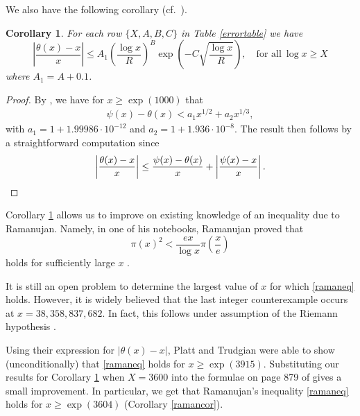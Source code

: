 \documentclass[reqno]{amsart}
\newtheorem{corollary}[theorem]{Corollary}
\numberwithin{equation}{section}
\theoremstyle{remark}
\begin{document}
We also have the following corollary (cf.\ \cite[Corollary 1]{P_T_2021}).
\begin{corollary}\label{errorcor}
    For each row $\{X,A,B,C\}$ in Table \ref{errortable} we have
    \begin{equation*}
        \left|\frac{\theta(x)-x}{x}\right|\leq A_1\left(\frac{\log x}{R}\right)^B\exp\left(-C\sqrt{\frac{\log x}{R}}\right),\quad\text{for all}\ \log x\geq X 
    \end{equation*}
    where $A_1=A+0.1$.
\end{corollary}
\begin{proof}
     By \cite[Corollary 5.1]{BKLNW_21}, we have for $x\geq\exp(1000)$ that
    \begin{align*}
        \psi(x)-\theta(x)<a_1x^{1/2}+a_2x^{1/3},
    \end{align*}
    with $a_1=1+1.99986\cdot 10^{-12}$ and $a_2=1+1.936\cdot 10^{-8}$. The result then follows by a straightforward computation since
    \begin{equation*}
        \left|\frac{\theta(x)-x}{x}\right|\leq\frac{\psi(x)-\theta(x)}{x}+\left|\frac{\psi(x)-x}{x}\right|.\qedhere
    \end{equation*}
\end{proof}

Corollary \ref{errorcor} allows us to improve on existing knowledge of an inequality due to Ramanujan. Namely, in one of his notebooks, Ramanujan proved that
\begin{equation}\label{ramaneq}
    \pi(x)^2<\frac{ex}{\log x}\pi\left(\frac{x}{e}\right)
\end{equation}
holds for sufficiently large $x$ \cite[pp. 112--114]{berndt2012ramanujan}.

It is still an open problem to determine the largest value of $x$ for which \eqref{ramaneq} holds. However, it is widely believed that the last integer counterexample occurs at $x=38,358,837,682$. In fact, this follows under assumption of the Riemann hypothesis \cite[Theorem 1.3]{dudek2015solving}. 

Using their expression for $|\theta(x)-x|$, Platt and Trudgian \cite[Theorem 2]{P_T_2021} were able to show (unconditionally) that \eqref{ramaneq} holds for $x\geq\exp(3915)$. Substituting our results for Corollary \ref{errorcor} when $X=3600$ into the formulae on page 879 of \cite{P_T_2021} gives a small improvement. In particular, we get that Ramanujan's inequality \eqref{ramaneq} holds for $x\geq\exp(3604)$ (Corollary \ref{ramancor}).
\end{document}
